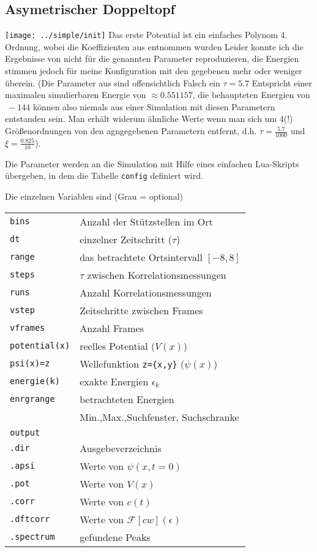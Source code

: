 \documentclass[10pt,a4paper,german]{scrartcl}
\begin{document}
  	\subsection{Asymetrischer Doppeltopf}
			\texttt{[image: ../simple/init]}
  		Das erste Potential ist ein einfaches Polynom 4. Ordnung, wobei die
  		Koeffizienten aus \cite{FFS} entnommen wurden Leider konnte ich die
  		Ergebnisse von \cite{FFS} nicht für die genannten Parameter reproduzieren, 
  		die Energien stimmen jedoch für meine Konfiguration mit den gegebenen mehr 
  		oder weniger überein. (Die Parameter aus \cite{FFS} sind offensichtlich Falsch
  		ein $\tau = 5.7$ Entspricht einer maximalen simulierbaren Energie von
  		$\approx 0.551157$, die behaupteten Energien von $~-144$ können also niemals
  		aus einer Simulation mit diesen Parametern entstanden sein. Man erhält 
  		widerum ähnliche Werte wenn man sich um 4(!) Größenordnungen von
  		den agngegebenen Parametern entfernt, d.h. $\tau = \frac{5.7}{1000}$ und
  		$\xi = \frac{0.825}{10}$).
  		
  		
			Die Parameter werden an die Simulation mit Hilfe eines einfachen
			Lua-Skripts übergeben, in dem die Tabelle 
			\lstinline!config! definiert wird.
			
			Die einzelnen Variablen sind (Grau = optional)
			
			\begin{tabular}{ll}
				\lstinline!bins! & Anzahl der Stützstellen im Ort\\
				\lstinline!dt!   & einzelner Zeitschritt ($\tau$)\\
				\lstinline!range!& das betrachtete Ortsintervall $[-8,8]$\\
				\lstinline!steps!& $\tau$ zwischen Korrelationsmessungen\\
				\lstinline!runs!& Anzahl Korrelationsmessungen\\
				\rowcolor{lightgray}
				\lstinline!vstep!& Zeitschritte zwischen Frames\\
				\rowcolor{lightgray}
				\lstinline!vframes!& Anzahl Frames\\
				\lstinline!potential(x)!& reelles Potential ($V(x)$)\\
				\lstinline!psi(x)=z!& Wellefunktion \lstinline!z={x,y}! ($\psi(x)$)\\
				\rowcolor{lightgray}
				\lstinline!energie(k)!& exakte Energien $\epsilon_k$\\
				\lstinline!enrgrange!& betrachteten Energien\\
				 & Min.,Max.,Suchfenster, Suchschranke\\
				\lstinline!output!& \\
				\lstinline!.dir!& Ausgebeverzeichnis\\
				\lstinline!.apsi!& Werte von $\psi(x,t=0)$\\
				\lstinline!.pot!& Werte von $V(x)$\\
				\lstinline!.corr!& Werte von $c(t)$\\
				\lstinline!.dftcorr!& Werte von $\mathcal{F}[cw](\epsilon)$ \\
				\lstinline!.spectrum!& gefundene Peaks \\
			\end{tabular}
			
\end{document}
